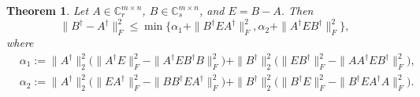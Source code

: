 \documentclass[11pt]{article}
\newtheorem{theorem}{Theorem}[section]
\begin{document}
\begin{theorem}\label{up-thm1}
Let $A\in\mathbb{C}^{m\times n}_{r}$, $B\in\mathbb{C}^{m\times n}_{s}$, and $E=B-A$. Then
\begin{equation}\label{up1}
\|B^{\dagger}-A^{\dagger}\|_{F}^{2}\leq\min\big\{\alpha_{1}+\|B^{\dagger}EA^{\dagger}\|_{F}^{2},\alpha_{2}+\|A^{\dagger}EB^{\dagger}\|_{F}^{2}\big\},
\end{equation}
where
\begin{align*}
&\alpha_{1}:=\|A^{\dagger}\|_{2}^{2}\big(\|A^{\dagger}E\|_{F}^{2}-\|A^{\dagger}EB^{\dagger}B\|_{F}^{2}\big)+\|B^{\dagger}\|_{2}^{2}\big(\|EB^{\dagger}\|_{F}^{2}-\|AA^{\dagger}EB^{\dagger}\|_{F}^{2}\big),\\
&\alpha_{2}:=\|A^{\dagger}\|_{2}^{2}\big(\|EA^{\dagger}\|_{F}^{2}-\|BB^{\dagger}EA^{\dagger}\|_{F}^{2}\big)+\|B^{\dagger}\|_{2}^{2}\big(\|B^{\dagger}E\|_{F}^{2}-\|B^{\dagger}EA^{\dagger}A\|_{F}^{2}\big).
\end{align*}
\end{theorem}
\end{document}
